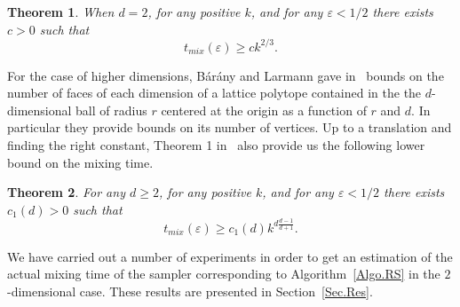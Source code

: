 \documentclass[a4paper]{article}
\newtheorem{theorem}{Theorem}
\begin{document}
\begin{theorem}\label{Thm.Lowerbound}
When $d=2$, for any positive $k$, and for any $\varepsilon<1/2$ there exists $c>0$ such that
$$
t_{mix}(\varepsilon)\geq{ck^{2/3}}\mbox{.}
$$
\end{theorem}

For the case of higher dimensions,  B{\'a}r{\'a}ny and Larmann gave in~\cite{barany1998convex} bounds on the number of faces of each dimension of a lattice polytope contained in the the $d$-dimensional ball of radius $r$ centered at the origin as a function of $r$ and $d$. In particular they provide bounds on its number of vertices. Up to a translation and finding the right constant, Theorem 1 in~\cite{barany1998convex} also provide us the following lower bound on the mixing time.

\begin{theorem}
  For any $d\geq 2$, for any positive $k$, and for any $\varepsilon<1/2$ there exists $c_1(d)>0$ such that
  $$
  t_{mix}(\varepsilon)\geq c_1(d)k^{d \frac{d-1}{d+1}}\mbox{.}
  $$
\end{theorem}

We have carried out a number of experiments in order to get an estimation of the actual mixing time of the sampler corresponding to Algorithm~\ref{Algo.RS} in the $2$-dimensional case. These results are presented in Section~\ref{Sec.Res}.




\end{document}
